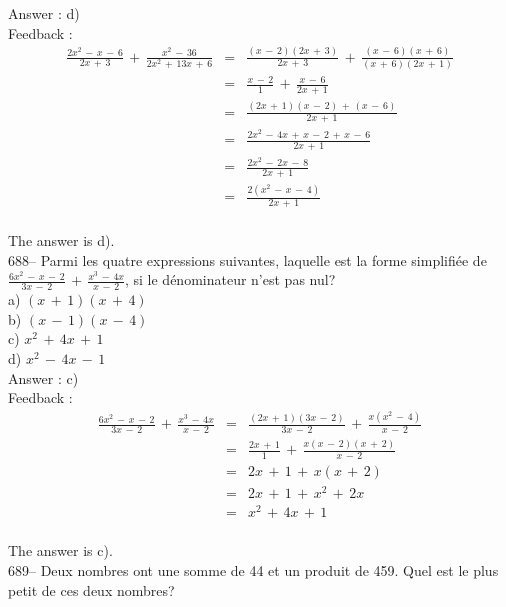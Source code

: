 ﻿\documentclass[letterpaper, 12pt]{article}
\begin{document}
Answer : d)\\

Feedback : \\
\begin{eqnarray*}
\frac{2x^{2}\,-\,x\,-\,6}{2x\,+\,3}\,+\,\frac{x^{2}\,-\,36}{2x^{2}\,+\,13x\,+\,6}&=&\frac{(x\,-\,2)(2x\,+\,3)}{2x\,+\,3}\,+\,\frac{(x\,-\,6)(x\,+\,6)}{(x\,+\,6)(2x\,+\,1)}\\[2mm]
&=&\frac{x\,-\,2}{1}\,+\,\frac{x\,-\,6}{2x\,+\,1}\\[2mm]
&=&\frac{(2x\,+\,1)(x\,-\,2)\,+\,(x\,-\,6)}{2x\,+\,1}\\[2mm]
&=&\frac{2x^{2}\,-\,4x\,+\,x\,-\,2\,+\,x\,-\,6}{2x\,+\,1}\\[2mm]
&=&\frac{2x^{2}\,-\,2x\,-\,8}{2x\,+\,1}\\[2mm]
&=&\frac{2(x^{2}\,-\,x\,-\,4)}{2x\,+\,1}\\
\end{eqnarray*}

The answer is d).\\

688-- Parmi les quatre expressions suivantes, laquelle est la forme
simplifi\'ee de
$\frac{6x^{2}\,-\,x\,-\,2}{3x\,-\,2}\,+\,\frac{x^{3}\,-\,4x}{x\,-\,2}$, si
le d\'enominateur n'est pas nul?\\
a) $(x\,+\,1)(x\,+\,4)$\\
b) $(x\,-\,1)(x\,-\,4)$\\
c) $x^{2}\,+\,4x\,+\,1$\\
d) $x^{2}\,-\,4x\,-\,1$\\

Answer : c)\\

Feedback : \\
\begin{eqnarray*}
\frac{6x^{2}\,-\,x\,-\,2}{3x\,-\,2}\,+\,\frac{x^{3}\,-\,4x}{x\,-\,2}&=&\frac{(2x\,+\,1)(3x\,-\,2)}{3x\,-\,2}\,+\,\frac{x(x^{2}\,-\,4)}{x\,-\,2}\\[2mm]
&=&\frac{2x\,+\,1}{1}\,+\,\frac{x(x\,-\,2)(x\,+\,2)}{x\,-\,2}\\[2mm]
&=&2x\,+\,1\,+\,x(x\,+\,2)\\[2mm]
&=&2x\,+\,1\,+\,x^{2}\,+\,2x\\[2mm]
&=&x^{2}\,+\,4x\,+\,1\\
\end{eqnarray*}

The answer is c).\\

689-- Deux nombres ont une somme de 44 et un produit de 459.  Quel est le
plus petit de ces deux nombres?\\
\end{document}
